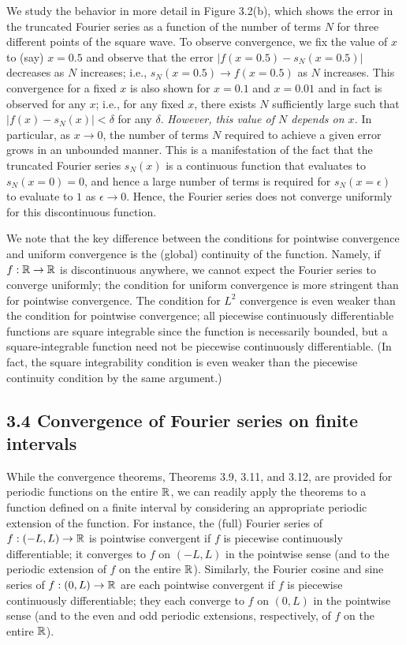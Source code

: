 \begin{example}
    We study the behavior in more detail in Figure 3.2(b), which shows the error in the truncated Fourier series as a function of the number of terms $N$ for three different points of the square wave. To observe convergence, we fix the value of $x$ to (say) $x = 0.5$ and observe that the error $|f(x = 0.5) - s_N(x = 0.5)|$ decreases as $N$ increases; i.e., $s_N(x = 0.5) \to f(x = 0.5)$ as $N$ increases. This convergence for a fixed $x$ is also shown for $x = 0.1$ and $x = 0.01$ and in fact is observed for any $x$; i.e., for any fixed $x$, there exists $N$ sufficiently large such that $|f(x) - s_N(x)| < \delta$ for any $\delta$. \textit{However, this value of $N$ depends on $x$.} In particular, as $x \to 0$, the number of terms $N$ required to achieve a given error grows in an unbounded manner. This is a manifestation of the fact that the truncated Fourier series $s_N(x)$ is a continuous function that evaluates to $s_N(x = 0) = 0$, and hence a large number of terms is required for $s_N(x = \epsilon)$ to evaluate to $1$ as $\epsilon \to 0$. Hence, the Fourier series does not converge uniformly for this discontinuous function.
\end{example}

We note that the key difference between the conditions for pointwise convergence and uniform convergence is the (global) continuity of the function. Namely, if $f : \mathbb{R} \to \mathbb{R}$ is discontinuous anywhere, we cannot expect the Fourier series to converge uniformly; the condition for uniform convergence is more stringent than for pointwise convergence. The condition for $L^2$ convergence is even weaker than the condition for pointwise convergence; all piecewise continuously differentiable functions are square integrable since the function is necessarily bounded, but a square-integrable function need not be piecewise continuously differentiable. (In fact, the square integrability condition is even weaker than the piecewise continuity condition by the same argument.)

\subsection{3.4 Convergence of Fourier series on finite intervals}
While the convergence theorems, Theorems 3.9, 3.11, and 3.12, are provided for periodic functions on the entire $\mathbb{R}$, we can readily apply the theorems to a function defined on a finite interval by considering an appropriate periodic extension of the function. For instance, the (full) Fourier series of $f : (-L, L) \to \mathbb{R}$ is pointwise convergent if $f$ is piecewise continuously differentiable; it converges to $f$ on $(-L, L)$ in the pointwise sense (and to the periodic extension of $f$ on the entire $\mathbb{R}$). Similarly, the Fourier cosine and sine series of $f : (0, L) \to \mathbb{R}$ are each pointwise convergent if $f$ is piecewise continuously differentiable; they each converge to $f$ on $(0, L)$ in the pointwise sense (and to the even and odd periodic extensions, respectively, of $f$ on the entire $\mathbb{R}$).

